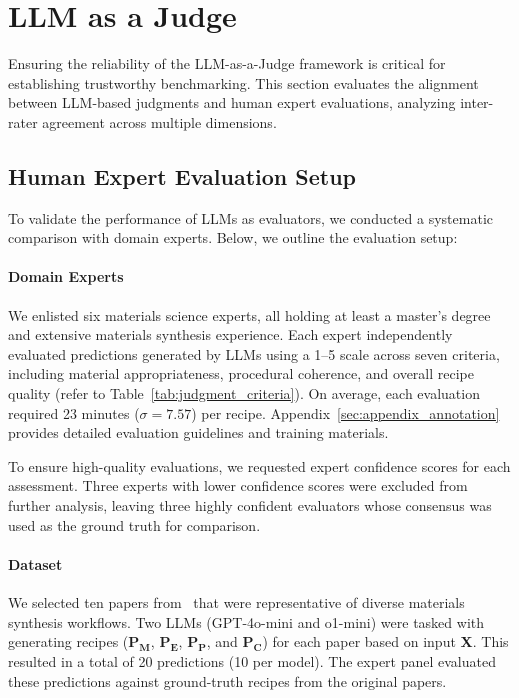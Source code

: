 \section{LLM as a Judge}
\label{sec:reliability}

Ensuring the reliability of the LLM-as-a-Judge framework is critical for establishing trustworthy benchmarking. This section evaluates the alignment between LLM-based judgments and human expert evaluations, analyzing inter-rater agreement across multiple dimensions.

\subsection{Human Expert Evaluation Setup}
\label{subsec:humaneval-setup}

To validate the performance of LLMs as evaluators, we conducted a systematic comparison with domain experts. Below, we outline the evaluation setup:

\paragraph*{Domain Experts}
We enlisted six materials science experts, all holding at least a master's degree and extensive materials synthesis experience. Each expert independently evaluated predictions generated by LLMs using a 1–5 scale across seven criteria, including material appropriateness, procedural coherence, and overall recipe quality (refer to Table~\ref{tab:judgment_criteria}). On average, each evaluation required 23 minutes (\(\sigma=7.57\)) per recipe. Appendix~\ref{sec:appendix_annotation} provides detailed evaluation guidelines and training materials.

To ensure high-quality evaluations, we requested expert confidence scores for each assessment. Three experts with lower confidence scores were excluded from further analysis, leaving three highly confident evaluators whose consensus was used as the ground truth for comparison.

\paragraph*{Dataset}
We selected ten papers from \oursdatashort~that were representative of diverse materials synthesis workflows. Two LLMs (GPT-4o-mini and o1-mini) were tasked with generating recipes (\(\mathbf{P_M}\), \(\mathbf{P_E}\), \(\mathbf{P_P}\), and \(\mathbf{P_C}\)) for each paper based on input \textbf{X}. This resulted in a total of 20 predictions (10 per model). The expert panel evaluated these predictions against ground-truth recipes from the original papers.

